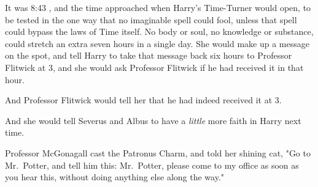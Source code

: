 It was 8:43 \PM, and the time approached when Harry's Time-Turner would open, to 
be tested in the one way that no imaginable spell could fool, unless that spell 
could bypass the laws of Time itself. No body or soul, no knowledge or 
substance, could stretch an extra seven hours in a single day. She would make 
up a message on the spot, and tell Harry to take that message back six hours to 
Professor Flitwick at 3\PM, and she would ask Professor Flitwick if he had 
received it in that hour.

And Professor Flitwick would tell her that he had indeed received it at 3\PM.

And she would tell Severus and Albus to have a \emph{little} more faith in 
Harry next time.

Professor McGonagall cast the Patronus Charm, and told her shining cat, "Go to 
Mr.~Potter, and tell him this: Mr.~Potter, please come to my office as soon as 
you hear this, without doing anything else along the way."
